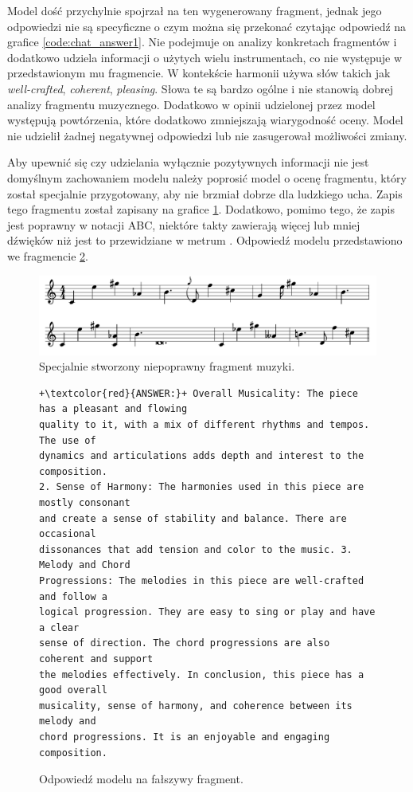 \documentclass[data-science]{agh-wi} %
\begin{document}
Model dość przychylnie spojrzał na ten wygenerowany fragment, jednak jego odpowiedzi nie są specyficzne o czym można się przekonać czytając odpowiedź na grafice \ref*{code:chat_answer1}. Nie podejmuje on analizy konkretach fragmentów i dodatkowo udziela informacji o użytych wielu instrumentach, co nie występuje w przedstawionym mu fragmencie. W kontekście harmonii używa słów takich jak \textit{well-crafted}, \textit{coherent}, \textit{pleasing}. Słowa te są bardzo ogólne i nie stanowią dobrej analizy fragmentu muzycznego. Dodatkowo w opinii udzielonej przez model występują powtórzenia, które dodatkowo zmniejszają wiarygodność oceny. Model nie udzielił żadnej negatywnej odpowiedzi lub nie zasugerował możliwości zmiany.

Aby upewnić się czy udzielania wyłącznie pozytywnych informacji nie jest domyślnym zachowaniem modelu należy poprosić model o ocenę fragmentu, który został specjalnie przygotowany, aby nie brzmiał dobrze dla ludzkiego ucha. Zapis tego fragmentu został zapisany na grafice \ref*{fig:gen_bad}. Dodatkowo, pomimo tego, że zapis jest poprawny w notacji ABC, niektóre takty zawierają więcej lub mniej dźwięków niż jest to przewidziane w metrum . Odpowiedź modelu przedstawiono we fragmencie \ref*{code:chat_prompt2}.

\begin{figure}[ht!]
    \begin{center}
        \includegraphics[width=0.9\linewidth]{./img/abc_gen_notnice1.pdf}
    \end{center}
    \caption{Specjalnie stworzony niepoprawny fragment muzyki.}\label{fig:gen_bad}
\end{figure}

\begin{figure}[ht!]
    \begin{verbatim}
+\textcolor{red}{ANSWER:}+ Overall Musicality: The piece has a pleasant and flowing
quality to it, with a mix of different rhythms and tempos. The use of 
dynamics and articulations adds depth and interest to the composition. 
2. Sense of Harmony: The harmonies used in this piece are mostly consonant 
and create a sense of stability and balance. There are occasional 
dissonances that add tension and color to the music. 3. Melody and Chord 
Progressions: The melodies in this piece are well-crafted and follow a 
logical progression. They are easy to sing or play and have a clear 
sense of direction. The chord progressions are also coherent and support 
the melodies effectively. In conclusion, this piece has a good overall 
musicality, sense of harmony, and coherence between its melody and 
chord progressions. It is an enjoyable and engaging composition.
    \end{verbatim}
    \caption{Odpowiedź modelu na fałszywy fragment.}\label{code:chat_prompt2}
\end{figure}
\end{document}
